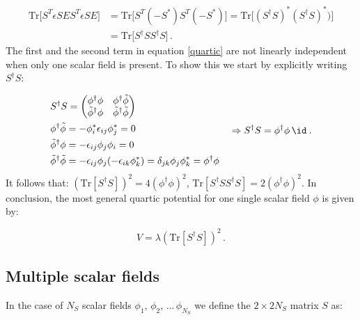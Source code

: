 \begin{equation}
\begin{split}
\mathrm{Tr} \bigl[ S^T \epsilon S E S^T \epsilon S E\bigr]  & = \mathrm{Tr} \bigl[ S^T (-S^*) S^T (-S^*) \bigr] = \mathrm{Tr} \bigl[ (S^{\dagger} S)^* (S^{\dagger} S)^*) \bigr] \\
& =\mathrm{Tr} \bigl[ S^{\dagger} S S^{\dagger} S\bigr] \, .
\end{split}
\label{proof2}
\end{equation}
%
The first and the second term in equation \ref{quartic} are not linearly independent when only one scalar field is present. To show this we start by explicitly writing $S^{\dagger} S$:

\begin{equation}
\begin{split}
& S^{\dagger} S = 
\begin{pmatrix}
\phi^{\dagger}\phi  & \phi^{\dagger} \tilde{\phi} \\
\tilde{\phi}^{\dagger} \phi & \tilde{\phi}^{\dagger} \tilde{\phi} \\
\end{pmatrix} \\
& \phi^{\dagger} \tilde{\phi} = - \phi^*_i \epsilon_{ij} \phi^*_j = 0 \\
& \tilde{\phi}^{\dagger} \phi = - \epsilon_{ij} \phi_j\phi_i = 0 \\
& \tilde{\phi}^{\dagger} \tilde{\phi} = - \epsilon_{ij} \phi_j (- \epsilon_{ik} \phi^*_k) = \delta_{jk} \phi_j \phi^*_k = \phi^{\dagger} \phi \\
\end{split}
\quad \Rightarrow  S^{\dagger} S = \phi^{\dagger} \phi \, \id \: .
\end{equation}
%
It follows that: $(\mathrm{Tr} [S^{\dagger} S])^2 = 4 (\phi^{\dagger} \phi)^2$, $\mathrm{Tr}[S^{\dagger} S S^{\dagger} S]= 2 (\phi^{\dagger} \phi)^2$.
In conclusion, the most general quartic potential for one single scalar field $\phi$ is given by:

\begin{equation}
V = \lambda (\mathrm{Tr} [S^{\dagger} S])^2  \, .
\end{equation}




\subsection{Multiple scalar fields}

In the case of $N_S$ scalar fields $\phi_1$, $\phi_2$, $\dots \, \phi_{N_S}$ we define the $2 \times 2N_S$ matrix $S$ as:


